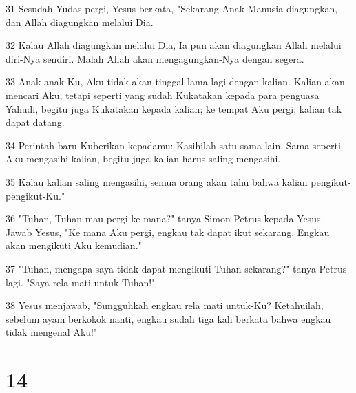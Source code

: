 \par 31 Sesudah Yudas pergi, Yesus berkata, "Sekarang Anak Manusia diagungkan, dan Allah diagungkan melalui Dia.
\par 32 Kalau Allah diagungkan melalui Dia, Ia pun akan diagungkan Allah melalui diri-Nya sendiri. Malah Allah akan mengagungkan-Nya dengan segera.
\par 33 Anak-anak-Ku, Aku tidak akan tinggal lama lagi dengan kalian. Kalian akan mencari Aku, tetapi seperti yang sudah Kukatakan kepada para penguasa Yahudi, begitu juga Kukatakan kepada kalian; ke tempat Aku pergi, kalian tak dapat datang.
\par 34 Perintah baru Kuberikan kepadamu: Kasihilah satu sama lain. Sama seperti Aku mengasihi kalian, begitu juga kalian harus saling mengasihi.
\par 35 Kalau kalian saling mengasihi, semua orang akan tahu bahwa kalian pengikut-pengikut-Ku."
\par 36 "Tuhan, Tuhan mau pergi ke mana?" tanya Simon Petrus kepada Yesus. Jawab Yesus, "Ke mana Aku pergi, engkau tak dapat ikut sekarang. Engkau akan mengikuti Aku kemudian."
\par 37 "Tuhan, mengapa saya tidak dapat mengikuti Tuhan sekarang?" tanya Petrus lagi. "Saya rela mati untuk Tuhan!"
\par 38 Yesus menjawab, "Sungguhkah engkau rela mati untuk-Ku? Ketahuilah, sebelum ayam berkokok nanti, engkau sudah tiga kali berkata bahwa engkau tidak mengenal Aku!"

\chapter{14}

